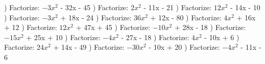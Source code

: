 \documentclass{article}%
\begin{document}
) Factorize: $-3x^2$ - 32x - 45%
\newline%
\newline%
) Factorize: $2x^2$ - 11x - 21%
\newline%
\newline%
) Factorize: $12x^2$ - 14x - 10%
\newline%
\newline%
) Factorize: $-3x^2$ + 18x - 24%
\newline%
\newline%
) Factorize: $36x^2$ + 12x - 80%
\newline%
\newline%
) Factorize: $4x^2$ + 16x + 12%
\newline%
\newline%
) Factorize: $12x^2$ + 47x + 45%
\newline%
\newline%
) Factorize: $-10x^2$ + 28x - 18%
\newline%
\newline%
) Factorize: $-15x^2$ + 25x + 10%
\newline%
\newline%
) Factorize: $-4x^2$ - 27x - 18%
\newline%
\newline%
) Factorize: $4x^2$ - 10x + 6%
\newline%
\newline%
) Factorize: $24x^2$ + 14x - 49%
\newline%
\newline%
) Factorize: $-30x^2$ - 10x + 20%
\newline%
\newline%
) Factorize: $-4x^2$ - 11x - 6%
\newline%
\newline%
\newline%
\end{document}
